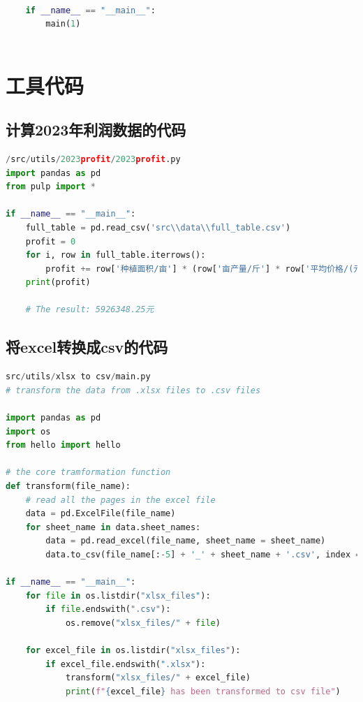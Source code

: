 \documentclass[withoutpreface]{cumcmthesis}
\begin{document}
\begin{appendices}
\begin{lstlisting}[language=python]
    
    if __name__ == "__main__":
        main(1)
    
\end{lstlisting}

\newpage
\section{工具代码}
\subsection{计算2023年利润数据的代码}
\begin{lstlisting}[language=python]
/src/utils/2023profit/2023profit.py
import pandas as pd
from pulp import *

if __name__ == "__main__":
    full_table = pd.read_csv('src\\data\\full_table.csv')
    profit = 0
    for i, row in full_table.iterrows():
        profit += row['种植面积/亩'] * (row['亩产量/斤'] * row['平均价格/(元/斤)'] - row['种植成本/(元/亩)'])
    print(profit)

    # The result: 5926348.25元
\end{lstlisting}

\subsection{将excel转换成csv的代码}
\begin{lstlisting}[language=python]
src/utils/xlsx to csv/main.py
# transform the data from .xlsx files to .csv files

import pandas as pd
import os
from hello import hello

# the core tramformation function
def transform(file_name):
    # read all the pages in the excel file
    data = pd.ExcelFile(file_name)
    for sheet_name in data.sheet_names:
        data = pd.read_excel(file_name, sheet_name = sheet_name)
        data.to_csv(file_name[:-5] + '_' + sheet_name + '.csv', index = False, encoding='utf-8')

if __name__ == "__main__":
    for file in os.listdir("xlsx_files"):
        if file.endswith(".csv"):
            os.remove("xlsx_files/" + file)

    for excel_file in os.listdir("xlsx_files"):
        if excel_file.endswith(".xlsx"):
            transform("xlsx_files/" + excel_file)
            print(f"{excel_file} has been transformed to csv file")
    


\end{lstlisting}
\end{appendices}
\end{document}
